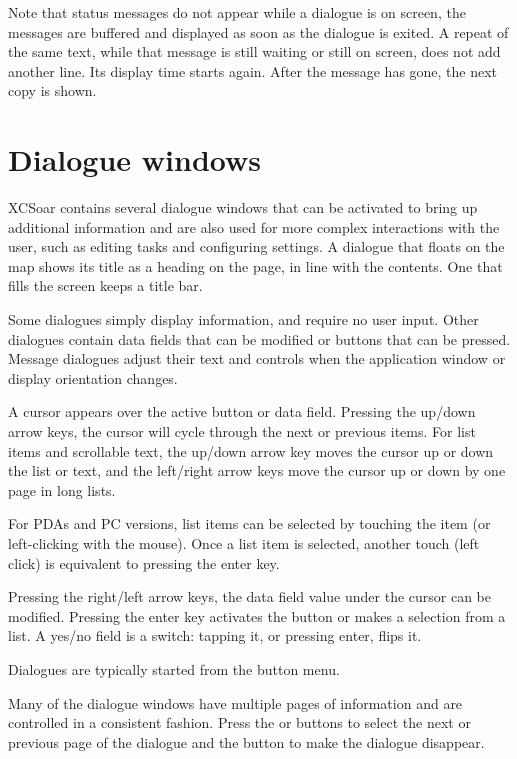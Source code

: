 Note that status messages do not appear while a dialogue is on screen, the
messages are buffered and displayed as soon as the dialogue is exited.
A repeat of the same text, while that message is still waiting or still
on screen, does not add another line.  Its display time starts again.
After the message has gone, the next copy is shown.


\section{Dialogue windows}\label{sec:dialog-windows}

XCSoar contains several dialogue windows that can be activated to bring up
additional information and are also used for more complex interactions with the
user, such as editing tasks and configuring settings. A dialogue that floats
on the map shows its title as a heading on the page, in line with the
contents. One that fills the screen keeps a title bar.

Some dialogues simply display information, and require no user input. Other
dialogues contain data fields that can be modified or buttons that can be pressed.  
Message dialogues adjust their text and controls when the application window
or display orientation changes.

A cursor appears over the active button or data field. Pressing the up/down
arrow keys, the cursor will cycle
through the next or previous items. For list items and scrollable text, the
up/down arrow key moves the cursor up or down the list or text, and the
left/right arrow keys move the cursor up or down by one page in long lists.

For PDAs and PC versions, list items can be selected by touching the item (or
left-clicking with the mouse). Once a list item is selected, another touch
(left click) is equivalent to pressing the enter key.

Pressing the right/left arrow keys, the data field value under the
cursor can be modified. Pressing the enter key activates the button or
makes a selection from a list. A yes/no field is a switch: tapping it,
or pressing enter, flips it.

Dialogues are typically started from the button menu.  

Many of the dialogue windows have multiple pages of information and are controlled
in a consistent fashion. Press the \bmenuw{$<$} or \bmenuw{$>$} buttons to
select the next or previous page of the dialogue and the  button 
to make the dialogue disappear.

